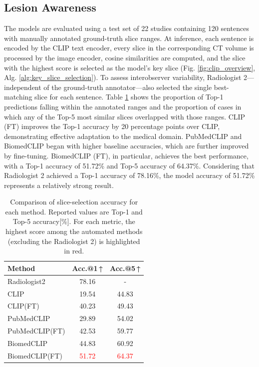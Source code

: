 \documentclass[bioengineering,article,submit,pdftex,moreauthors]{Definitions/mdpi}
\begin{document}
\subsection{Lesion Awareness}\label{sec:lesion_aware}
The models are evaluated using a test set of 22 studies containing 120 sentences with manually annotated ground-truth slice ranges. 
At inference, each sentence is encoded by the CLIP text encoder, every slice in the corresponding CT volume is processed by the image encoder, cosine similarities are computed, and the slice with the highest score is selected as the model’s key slice (Fig. \ref{fig:clip_overview}, Alg. \ref{alg:key_slice_selection}). 
To assess interobserver variability, Radiologist 2—independent of the ground-truth annotator—also selected the single best-matching slice for each sentence.
Table \ref{tab:slice_extraction_accuracy} shows the proportion of Top-1 predictions falling within the annotated ranges and the proportion of cases in which any of the Top-5 most similar slices overlapped with those ranges. 
CLIP (FT) improves the Top-1 accuracy by 20 percentage points over CLIP, demonstrating effective adaptation to the medical domain.
PubMedCLIP and BiomedCLIP began with higher baseline accuracies, which are further improved by fine-tuning. 
BiomedCLIP (FT), in particular, achieves the best performance, with a Top-1 accuracy of 51.72\% and Top-5 accuracy of 64.37\%. 
Considering that Radiologist 2 achieved a Top-1 accuracy of 78.16\%, the model accuracy of 51.72\% represents a relatively strong result.



\begin{table}[ht]
  \centering
  \caption{Comparison of slice-selection accuracy for each method. 
  Reported values are Top-1 and Top-5 accuracy[\%]. 
  For each metric, the highest score among the automated methods (excluding the Radiologist 2) is highlighted in red.}
  \label{tab:slice_extraction_accuracy}
  \begin{tabular}{lcc}
    \toprule
    Method                  & Acc.@1\,↑      & Acc.@5\,↑      \\
    \midrule
    Radiologist2            & 78.16       & -           \\
    CLIP                    & 19.54       & 44.83       \\
    CLIP(FT)                & 40.23       & 49.43       \\
    PubMedCLIP              & 29.89       & 54.02       \\
    PubMedCLIP(FT)          & 42.53       & 59.77       \\
    BiomedCLIP              & 44.83       & 60.92       \\
    BiomedCLIP(FT)          & \textcolor{red}{51.72} & \textcolor{red}{64.37} \\
    \bottomrule
  \end{tabular}
\end{table}
\end{document}

